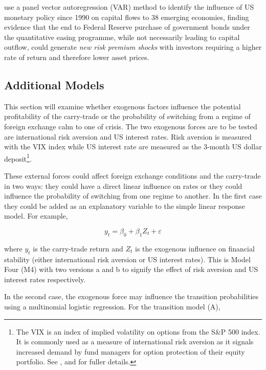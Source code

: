 \documentclass[12pt, a4paper, oneside]{article}\usepackage[]{graphicx}\usepackage[]{color}
\begin{document}
\citet{IMFLatam} use a panel vector autoregression (VAR) method to identify the influence of US monetary policy since 1990 on capital flows to 38 emerging economies, finding evidence that the end to Federal Reserve purchase of government bonds under the quantitative easing programme, while not necessarily leading to capital outflow, could generate \emph{new risk premium shocks} with investors requiring a higher rate of return and therefore lower asset prices.

\subsection{Additional Models}
This section will examine whether exogenous factors influence the potential profitability of the carry-trade or the probability of switching from a regime of foreign exchange calm to one of crisis.  The two exogenous forces are to be tested are international risk aversion and US interest rates.  Risk aversion is measured with the VIX index while US interest rate are measured as the 3-month US dollar deposit\footnote{The VIX is an index of implied volatility on options from the S\&P 500 index.  It is commonly used as a measure of international risk aversion as it signals increased demand by fund managers for option protection of their equity portfolio.  See \citet{VIX}, \citet{GoldmanVol} and \citet{Diamond} for fuller details.}.   

These external forces could affect foreign exchange conditions and the carry-trade in two ways:  they could have a direct linear influence on rates or they could influence the probability of switching from one regime to another.  In the first case they could be added as an explanatory variable to the simple linear response model. For example, 

\begin{equation}
\label{eqref:vix}
y_t = \beta_0 + \beta_1 Z_t + \varepsilon
\end{equation}

where $y_t$ is the carry-trade return and $Z_t$ is the exogenous influence on financial stability (either international risk aversion or US interest rates). This is Model Four (M4) with two versions a and b to signify the effect of risk aversion and US interest rates respectively.  

In the second case, the exogenous force may influence the transition probabilities using a multinomial logistic regression. For the transition model (A), 
\end{document}
